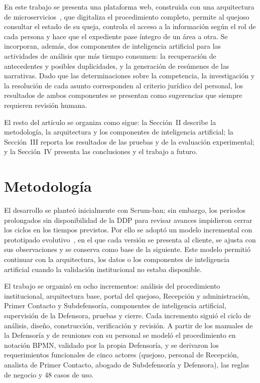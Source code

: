 \documentclass[conference,letterpaper]{IEEEtran}
\begin{document}
En este trabajo se presenta una plataforma web, construida con una arquitectura de microservicios~\cite{villamizar}, que digitaliza el procedimiento completo, permite al quejoso consultar el estado de su queja, controla el acceso a la información según el rol de cada persona y hace que el expediente pase íntegro de un área a otra. Se incorporan, además, dos componentes de inteligencia artificial para las actividades de análisis que más tiempo consumen: la recuperación de antecedentes y posibles duplicidades, y la generación de resúmenes de las narrativas. Dado que las determinaciones sobre la competencia, la investigación y la resolución de cada asunto corresponden al criterio jurídico del personal, los resultados de ambos componentes se presentan como sugerencias que siempre requieren revisión humana.

El resto del artículo se organiza como sigue: la Sección~II describe la metodología, la arquitectura y los componentes de inteligencia artificial; la Sección~III reporta los resultados de las pruebas y de la evaluación experimental; y la Sección~IV presenta las conclusiones y el trabajo a futuro.

\section{Metodología}

El desarrollo se planteó inicialmente con Scrum-ban; sin embargo, los periodos prolongados sin disponibilidad de la DDP para revisar avances impidieron cerrar los ciclos en los tiempos previstos. Por ello se adoptó un modelo incremental con prototipado evolutivo~\cite{pressman,sommerville}, en el que cada versión se presenta al cliente, se ajusta con sus observaciones y se conserva como base de la siguiente. Este modelo permitió continuar con la arquitectura, los datos o los componentes de inteligencia artificial cuando la validación institucional no estaba disponible.

El trabajo se organizó en ocho incrementos: análisis del procedimiento institucional, arquitectura base, portal del quejoso, Recepción y administración, Primer Contacto y Subdefensoría, componentes de inteligencia artificial, supervisión de la Defensora, pruebas y cierre. Cada incremento siguió el ciclo de análisis, diseño, construcción, verificación y revisión. A partir de los manuales de la Defensoría y de reuniones con su personal se modeló el procedimiento en notación BPMN, validado por la propia Defensoría, y se derivaron los requerimientos funcionales de cinco actores (quejoso, personal de Recepción, analista de Primer Contacto, abogado de Subdefensoría y Defensora), las reglas de negocio y 48 casos de uso.
\end{document}
